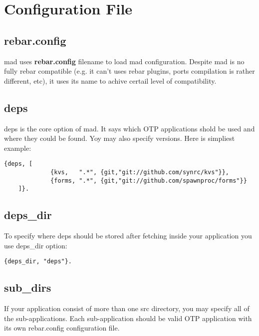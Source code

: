 \section{Configuration File}

\subsection{rebar.config}

mad uses {\bf rebar.config} filename to load mad configuration.
Despite mad is no fully rebar compatible (e.g. it can't uses
rebar plugins, ports compilation is rather different, etc),
it uses its name to achive certail level of compatibility.

\subsection{deps}

deps is the core option of mad. It says which OTP applications
shold be used and where they could be found. Yoy may also specify
versions. Here is simpliest example:

\vspace{1\baselineskip}
\begin{lstlisting}[caption=deps Option]
    {deps, [
             {kvs,   ".*", {git,"git://github.com/synrc/kvs"}},
             {forms, ".*", {git,"git://github.com/spawnproc/forms"}}
    ]}.
\end{lstlisting}
\vspace{1\baselineskip}

\subsection{deps\_dir}

To specify where deps should be stored after fetching inside
your application you use deps\_dir option:

\vspace{1\baselineskip}
\begin{lstlisting}[caption=deps\_dir Option]
    {deps_dir, "deps"}.
\end{lstlisting}
\vspace{1\baselineskip}

\subsection{sub\_dirs}

If your application consist of more than one src
directory, you may specify all of the sub-applications.
Each sub-application should be valid OTP application
with its own rebar.config configuration file.

